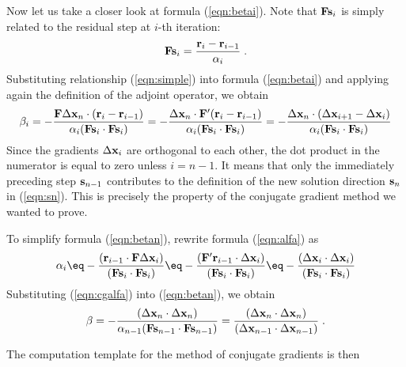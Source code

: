   Now let us take a closer look at formula (\ref{eqn:betai}). Note
  that $\bold F \bold s_i$ is simply related to the residual step at
  $i$-th iteration: 
  \begin{equation}
  \label{eqn:simple}
\bold F \bold s_i = \frac{\bold r_i - \bold
    r_{i-1}}{\alpha_i}\;.
  \end{equation}
  Substituting relationship (\ref{eqn:simple}) into formula
  (\ref{eqn:betai}) and applying again the definition of the adjoint
  operator, we obtain
\begin{equation}
  \label{eqn:betan}  
   \beta_i = 
  - \frac{ \bold F \Delta \bold x_n \cdot (\bold r_i - \bold r_{i-1})}
  {\alpha_i (\bold F \bold s_i \cdot \bold F \bold s_i )} =
  - \frac{\Delta \bold x_n \cdot \bold F' (\bold r_i - \bold r_{i-1})}
  {\alpha_i (\bold F \bold s_i \cdot \bold F \bold s_i )} =
  - \frac{ \Delta \bold x_n \cdot (\Delta \bold x_{i+1} - \Delta \bold x_i)}
  {\alpha_i (\bold F \bold s_i \cdot \bold F \bold s_i )} 
\end{equation}
Since the gradients $\Delta \bold x_i$ are orthogonal to each other,
the dot product in the numerator is equal to zero unless $i = n-1$. It
means that only the immediately preceding step $\bold s_{n-1}$
contributes to the definition of the new solution direction $\bold
s_n$ in (\ref{eqn:sn}). This is precisely the property of the
conjugate gradient method we wanted to prove.
\par
To simplify formula (\ref{eqn:betan}), rewrite formula (\ref{eqn:alfa}) as
\begin{equation}
  \label{eqn:cgalfa}
  \alpha_i \eq - \frac 
  { (\bold r_{i-1} \cdot \bold F \Delta \bold x_i )}
  {( \bold F \bold s_i \cdot \bold F \bold s_i ) } \eq - \frac
  { (\bold F' \bold r_{i-1} \cdot \Delta \bold x_i )}
  {( \bold F \bold s_i \cdot \bold F \bold s_i ) } \eq - \frac
  { (\Delta \bold x_i \cdot \Delta \bold x_i )}
  {( \bold F \bold s_i \cdot \bold F \bold s_i ) }
\end{equation}
Substituting (\ref{eqn:cgalfa}) into (\ref{eqn:betan}), we obtain 
\begin{equation}
  \label{eqn:cgbeta}  
   \beta = 
  - \frac{( \Delta \bold x_n \cdot \Delta \bold x_n)}
  {\alpha_{n-1} (\bold F \bold s_{n-1} \cdot \bold F \bold s_{n-1} )} =
  \frac{(\Delta \bold x_n \cdot \Delta \bold x_n)}
  {(\Delta \bold x_{n-1} \cdot \Delta \bold x_{n-1})}\;.
\end{equation}
\par
The computation template for the method of conjugate gradients is then

